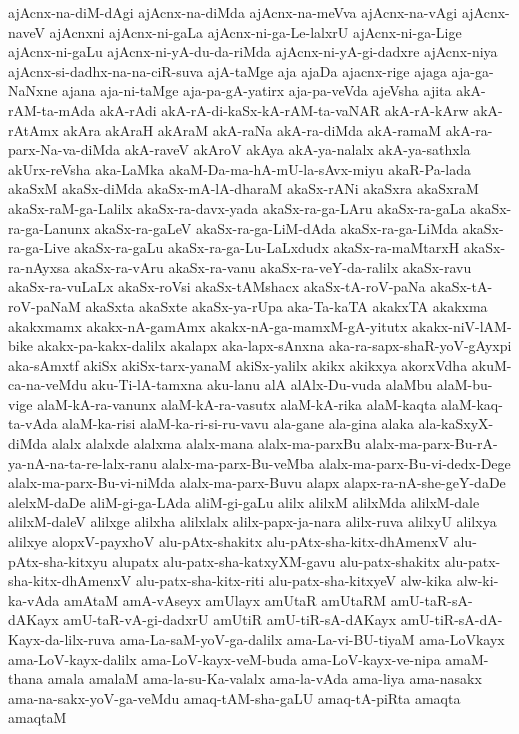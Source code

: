 {ajAcnx-na-diM-dAgi
ajAcnx-na-diMda
ajAcnx-na-meVva
ajAcnx-na-vAgi
ajAcnx-naveV
ajAcnxni
ajAcnx-ni-gaLa
ajAcnx-ni-ga-Le-lalxrU
ajAcnx-ni-ga-Lige
ajAcnx-ni-gaLu
ajAcnx-ni-yA-du-da-riMda
ajAcnx-ni-yA-gi-dadxre
ajAcnx-niya
ajAcnx-si-dadhx-na-na-ciR-suva
ajA-taMge
aja
ajaDa
ajacnx-rige
ajaga
aja-ga-NaNxne
ajana
aja-ni-taMge
aja-pa-gA-yatirx
aja-pa-veVda
ajeVsha
ajita
akA-rAM-ta-mAda
akA-rAdi
akA-rA-di-kaSx-kA-rAM-ta-vaNAR
akA-rA-kArw
akA-rAtAmx
akAra
akAraH
akAraM
akA-raNa
akA-ra-diMda
akA-ramaM
akA-ra-parx-Na-va-diMda
akA-raveV
akAroV
akAya
akA-ya-nalalx
akA-ya-sathxla
akUrx-reVsha
aka-LaMka
akaM-Da-ma-hA-mU-la-sAvx-miyu
akaR-Pa-lada
akaSxM
akaSx-diMda
akaSx-mA-lA-dharaM
akaSx-rANi
akaSxra
akaSxraM
akaSx-raM-ga-Lalilx
akaSx-ra-davx-yada
akaSx-ra-ga-LAru
akaSx-ra-gaLa
akaSx-ra-ga-Lanunx
akaSx-ra-gaLeV
akaSx-ra-ga-LiM-dAda
akaSx-ra-ga-LiMda
akaSx-ra-ga-Live
akaSx-ra-gaLu
akaSx-ra-ga-Lu-LaLxdudx
akaSx-ra-maMtarxH
akaSx-ra-nAyxsa
akaSx-ra-vAru
akaSx-ra-vanu
akaSx-ra-veY-da-ralilx
akaSx-ravu
akaSx-ra-vuLaLx
akaSx-roVsi
akaSx-tAMshacx
akaSx-tA-roV-paNa
akaSx-tA-roV-paNaM
akaSxta
akaSxte
akaSx-ya-rUpa
aka-Ta-kaTA
akakxTA
akakxma
akakxmamx
akakx-nA-gamAmx
akakx-nA-ga-mamxM-gA-yitutx
akakx-niV-lAM-bike
akakx-pa-kakx-dalilx
akalapx
aka-lapx-sAnxna
aka-ra-sapx-shaR-yoV-gAyxpi
aka-sAmxtf
akiSx
akiSx-tarx-yanaM
akiSx-yalilx
akikx
akikxya
akorxVdha
akuM-ca-na-veMdu
aku-Ti-lA-tamxna
aku-lanu
alA
alAlx-Du-vuda
alaMbu
alaM-bu-vige
alaM-kA-ra-vanunx
alaM-kA-ra-vasutx
alaM-kA-rika
alaM-kaqta
alaM-kaq-ta-vAda
alaM-ka-risi
alaM-ka-ri-si-ru-vavu
ala-gane
ala-gina
alaka
ala-kaSxyX-diMda
alalx
alalxde
alalxma
alalx-mana
alalx-ma-parxBu
alalx-ma-parx-Bu-rA-ya-nA-na-ta-re-lalx-ranu
alalx-ma-parx-Bu-veMba
alalx-ma-parx-Bu-vi-dedx-Dege
alalx-ma-parx-Bu-vi-niMda
alalx-ma-parx-Buvu
alapx
alapx-ra-nA-she-geY-daDe
alelxM-daDe
aliM-gi-ga-LAda
aliM-gi-gaLu
alilx
alilxM
alilxMda
alilxM-dale
alilxM-daleV
alilxge
alilxha
alilxlalx
alilx-papx-ja-nara
alilx-ruva
alilxyU
alilxya
alilxye
alopxV-payxhoV
alu-pAtx-shakitx
alu-pAtx-sha-kitx-dhAmenxV
alu-pAtx-sha-kitxyu
alupatx
alu-patx-sha-katxyXM-gavu
alu-patx-shakitx
alu-patx-sha-kitx-dhAmenxV
alu-patx-sha-kitx-riti
alu-patx-sha-kitxyeV
alw-kika
alw-ki-ka-vAda
amAtaM
amA-vAseyx
amUlayx
amUtaR
amUtaRM
amU-taR-sA-dAKayx
amU-taR-vA-gi-dadxrU
amUtiR
amU-tiR-sA-dAKayx
amU-tiR-sA-dA-Kayx-da-lilx-ruva
ama-La-saM-yoV-ga-dalilx
ama-La-vi-BU-tiyaM
ama-LoVkayx
ama-LoV-kayx-dalilx
ama-LoV-kayx-veM-buda
ama-LoV-kayx-ve-nipa
amaM-thana
amala
amalaM
ama-la-su-Ka-valalx
ama-la-vAda
ama-liya
ama-nasakx
ama-na-sakx-yoV-ga-veMdu
amaq-tAM-sha-gaLU
amaq-tA-piRta
amaqta
amaqtaM
}
